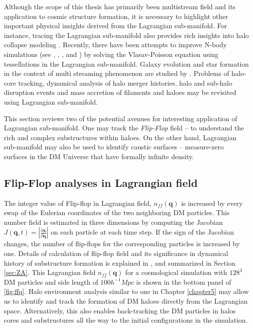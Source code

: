 Although the scope of this thesis has primarily been multistream field and its application to cosmic structure formation, it is necessary to highlight other important physical insights derived from the Lagrangian sub-manifold. For instance, tracing the Lagrangian sub-manifold also provides rich insights into halo collapse modeling \cite{Neyrinck2016}. Recently, there have been attempts to improve N-body simulations (see \cite{Hahn2013}, \cite{Angulo2013a}, \cite{Angulo2013b}, \cite{Sousbie2015} and \cite{Hahn2016a}) by solving the Vlasav-Poisson equation using tessellations in the Lagrangian sub-manifold. Galaxy evolution and star formation in the context of multi streaming phenomenon are studied by \cite{Aragon-Calvo2016}. Problems of halo-core tracking, dynamical analysis of halo merger histories, halo and sub-halo disruption events and mass accretion of filaments and haloes may be revisited using Lagrangian sub-manifold.

This section reviews two of the potential avenues for interesting application of Lagrangian sub-manifold. One may track the {\it Flip-Flop} field -- to understand the rich and complex substructures within haloes. On the other hand, Lagrangian sub-manifold may also be used to identify caustic surfaces -- measure-zero surfaces in the DM Universe that have formally infinite density. 


\subsection{Flip-Flop analyses in Lagrangian field}

The integer value of Flip-flop in Lagrangian field, $n_{ff}(\mathbf{q})$ is increased by every swap of the Eulerian coordinates of the two neighboring DM particles. This number field is estimated in three dimensions by computing the Jacobian  $J(\mathbf{q}, t) = |\frac{\partial\mathbf{x}}{\partial\mathbf{q}}|$  on each particle at each time step. If the sign of the Jacobian changes, the number of flip-flops for the corresponding particles is increased by one. Details of calculation of flip-flop field and its significance in dynamical history of substructure formation is explained in \citep{Shandarin2016}, and summarized in Section \ref{sec:ZA}. This Lagrangian field $n_{ff}(\mathbf{q})$ for a cosmological simulation with $128^3$ DM particles and side length of $100 h^{-1} Mpc$ is shown in the bottom panel of \autoref{fig:ffq}. Halo environment analysis similar to one in Chapter \ref{chapter5} may allow us to identify and track the formation of DM haloes directly from the Lagrangian space. Alternatively, this also enables back-tracking the DM particles in halos cores and substructures all the way to the initial configurations in the simulation.  

